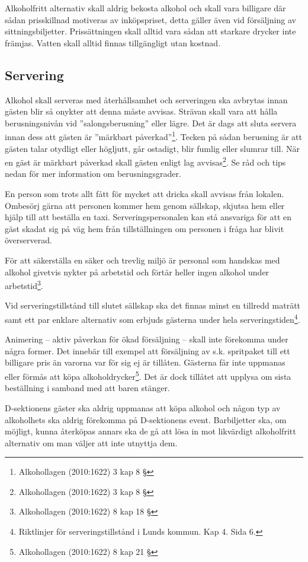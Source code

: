 \documentclass[]{dsekprotokoll}
\begin{document}
Alkoholfritt alternativ skall aldrig bekosta alkohol och skall vara billigare där sådan prisskillnad motiveras av inköpspriset, detta gäller även vid försäljning av sittningsbiljetter. Prissättningen skall alltid vara sådan att starkare drycker inte främjas. Vatten skall alltid finnas tillgängligt utan kostnad.

\subsection{Servering}

Alkohol skall serveras med återhållsamhet och serveringen ska avbrytas innan gästen blir så
onykter att denna måste avvisas. Strävan skall vara att hålla berusningsnivån vid ''salongsberusning'' eller lägre. Det är dags att sluta servera innan dess att gästen är ''märkbart påverkad''\footnote{Alkohollagen (2010:1622) 3 kap 8 §
}. Tecken på sådan berusning är att gästen talar otydligt eller högljutt, går ostadigt, blir fumlig eller slumrar till. När en gäst är märkbart påverkad skall gästen enligt lag avvisas\footnote{Alkohollagen (2010:1622) 3 kap 8 §}. Se råd och tips nedan för mer information om berusningsgrader.

En person som trots allt fått för mycket att dricka skall avvisas från lokalen. Ombesörj gärna att personen kommer hem genom sällskap, skjutsa hem eller hjälp till att beställa en taxi. Serveringspersonalen kan stå ansvariga för att en gäst skadat sig på väg hem från tillställningen om personen i fråga har blivit överserverad.

För att säkerställa en säker och trevlig miljö är personal som handskas med alkohol givetvis nykter på arbetstid och förtär heller ingen alkohol under arbetstid\footnote{Alkohollagen (2010:1622) 8 kap 18 §}.

Vid serveringstillstånd till slutet sällskap ska det finnas minst en tillredd maträtt samt ett par
enklare alternativ som erbjuds gästerna under hela serveringstiden\footnote{Riktlinjer för serveringstillstånd i Lunds kommun. Kap 4. Sida 6.}.

Animering – aktiv påverkan för ökad försäljning – skall inte förekomma under några former. Det innebär till exempel att försäljning av s.k. spritpaket till ett billigare pris än varorna var för sig ej är tillåten. Gästerna får inte uppmanas eller förmås att köpa alkoholdrycker\footnote{Alkohollagen (2010:1622) 8 kap 21 §}. Det
är dock tillåtet att upplysa om sista beställning i samband med att baren stänger.

D-sektionens gäster ska aldrig uppmanas att köpa alkohol och någon typ av alkoholhets
ska aldrig förekomma på D-sektionens event. Barbiljetter ska, om möjligt, kunna
återköpas annars ska de gå att lösa in mot likvärdigt alkoholfritt alternativ om man väljer att
inte utnyttja dem.
\end{document}
